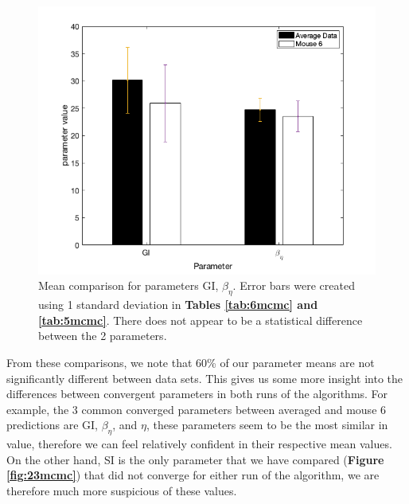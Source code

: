 \documentclass{article}
\begin{document}
\begin{figure}[H]
    \centering
    \includegraphics[width=15cm]{MCMC_figs/dram_t1d_final/mouse6_avg_paramComp2.png}
    \caption{Mean comparison for parameters GI, $\beta_{\eta}$. Error bars were created using 1 standard deviation in \textbf{Tables \ref{tab:6mcmc} and \ref{tab:5mcmc}}. There does not appear to be a statistical difference between the 2 parameters.}
    \label{fig:24mcmc}
\end{figure}
From these comparisons, we note that 60\% of our parameter means are not significantly different between data sets. This gives us some more insight into the differences between convergent parameters in both runs of the algorithms. For example, the 3 common converged parameters between averaged and mouse 6 predictions are GI, $\beta_{\eta}$, and $\eta$, these parameters seem to be the most similar in value, therefore we can feel relatively confident in their respective mean values. On the other hand, SI is the only parameter that we have compared (\textbf{Figure \ref{fig:23mcmc}}) that did not converge for either run of the algorithm, we are therefore much more suspicious of these values. 
\renewcommand\appendixname{Appendix}
\end{document}
